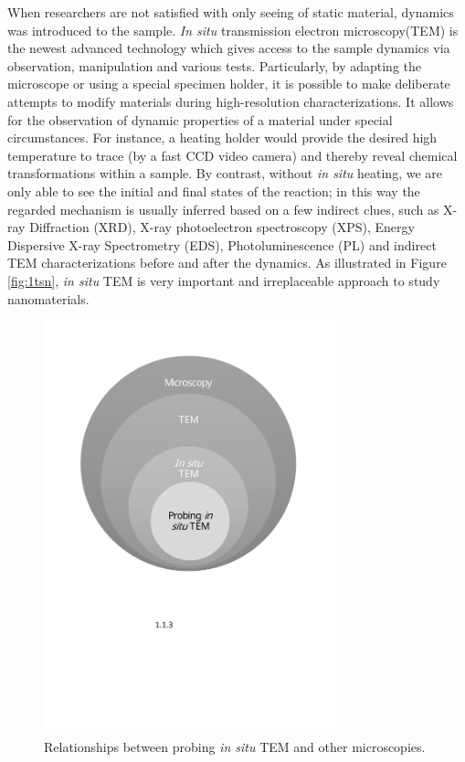 When researchers are not satisfied with only seeing of static material, dynamics was introduced to the sample. \emph{In situ} transmission electron microscopy(TEM) is the newest advanced technology which gives access to the sample dynamics via observation, manipulation and various tests. Particularly, by adapting the microscope or using a special specimen holder, it is possible to make deliberate attempts to modify materials during high-resolution characterizations. It allows for the observation of dynamic properties of a material under special circumstances. \cite{banhart2008situ}For instance, a heating holder would provide the desired high temperature to trace (by a fast CCD video camera) and thereby reveal chemical transformations within a sample. By contrast, without \emph{in situ} heating, we are only able to see the initial and final states of the reaction; in this way the regarded mechanism is usually inferred based on a few indirect clues, such as X-ray Diffraction (XRD), X-ray photoelectron spectroscopy (XPS), Energy Dispersive X-ray Spectrometry (EDS), Photoluminescence (PL) and indirect TEM characterizations before and after the dynamics. As illustrated in Figure \ref{fig:1tsn}, \emph{in situ} TEM is very important and irreplaceable approach to study nanomaterials. 

\begin{figure}  
\centering
\includegraphics[width=240pt]{figures/figure1_TEM_As_Microscopy.pdf}
\caption[\emph{In situ} TEM as a microscopy]{Relationships between probing \emph{in situ} TEM and other microscopies.
\label{fig:1tam}}
\end{figure}

